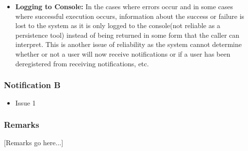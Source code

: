 \begin{itemize}
\item \textbf{Logging to Console:}\newline
     In the cases where errors occur and in some cases where successful execution occurs, information about the success or failure is lost to the system as it is only logged to the console(not reliable as a persistence tool) instead of being returned in some form that the caller can interpret. This is another issue of reliability as the system cannot determine whether or not a user will now receive notifications or if a user has been deregistered from receiving notifications, etc.
\end{itemize}
\subsubsection*{Notification B}
\begin{itemize}
	\item Issue 1
\end{itemize}
\subsubsection*{Remarks}
[Remarks go here...]